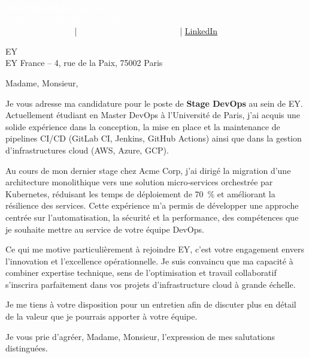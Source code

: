 \documentclass[11pt,a4paper]{letter}
\makeatletter
\newcommand{\CandidateName}{Aziz BELHADJ SAYAR}
\newcommand{\CandidateAddress}{12 Rue de la République, 75002 Paris}
\newcommand{\CandidatePhone}{+33 6 12 34 56 78}
\newcommand{\CandidateEmail}{aziz.belhadj@example.com}
\newcommand{\CandidateWebsite}{\href{https://www.linkedin.com/in/azizbelhadj}{LinkedIn}}
\newcommand{\CompanyName}{EY}
\newcommand{\CompanyAddress}{EY France – 4, rue de la Paix, 75002 Paris}
\newcommand{\Position}{Stage DevOps}
\makeatother
\begin{document}
\begin{center}
  \vspace{-2cm}
  \colorbox{headercolor}{\parbox{\dimexpr\textwidth-2cm}{%
      \centering
      \textcolor{white}{\bfseries \large \CandidateName}\\[2pt]
      \textcolor{white}{\CandidateAddress}\\
      \textcolor{white}{\CandidatePhone} \quad | \quad
      \textcolor{white}{\CandidateEmail} \quad | \quad
      \textcolor{white}{\CandidateWebsite}
  }}
  \vspace{1.5cm}
\end{center}

\begin{letter}{\CompanyName\\\CompanyAddress}

\opening{Madame, Monsieur,}

Je vous adresse ma candidature pour le poste de \textbf{\Position} au sein de \CompanyName.  
Actuellement étudiant en Master DevOps à l’Université de Paris, j’ai acquis une solide expérience dans la conception, la mise en place et la maintenance de pipelines CI/CD (GitLab CI, Jenkins, GitHub Actions) ainsi que dans la gestion d’infrastructures cloud (AWS, Azure, GCP).  

Au cours de mon dernier stage chez \textcolor{accentcolor}{Acme Corp}, j’ai dirigé la migration d’une architecture monolithique vers une solution micro‑services orchestrée par Kubernetes, réduisant les temps de déploiement de 70~\% et améliorant la résilience des services. Cette expérience m’a permis de développer une approche centrée sur l’automatisation, la sécurité et la performance, des compétences que je souhaite mettre au service de votre équipe DevOps.  

Ce qui me motive particulièrement à rejoindre EY, c’est votre engagement envers l’innovation et l’excellence opérationnelle. Je suis convaincu que ma capacité à combiner expertise technique, sens de l’optimisation et travail collaboratif s’inscrira parfaitement dans vos projets d’infrastructure cloud à grande échelle.  

Je me tiens à votre disposition pour un entretien afin de discuter plus en détail de la valeur que je pourrais apporter à votre équipe.  

Je vous prie d’agréer, Madame, Monsieur, l’expression de mes salutations distinguées.

\closing{}

\end{letter}
\end{document}
